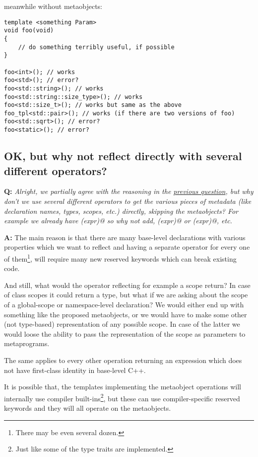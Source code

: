 meanwhile without metaobjects:

\begin{verbatim}
template <something Param>
void foo(void)
{
	// do something terribly useful, if possible
}

foo<int>(); // works
foo<std>(); // error?
foo<std::string>(); // works
foo<std::string::size_type>(); // works
foo<std::size_t>(); // works but same as the above
foo_tpl<std::pair>(); // works (if there are two versions of foo)
foo<std::sqrt>(); // error?
foo<static>(); // error?
\end{verbatim}

\subsection{OK, but why not reflect directly with several different operators?}

\textbf{Q:} {\em Alright, we partially agree with the reasoning in the
\hyperref[faq-why-metaobjects]{previous question}, but why don't we use several
different operators to get the various pieces of metadata (like declaration names,
types, scopes, etc.) directly, skipping the metaobjects?
For example we already have \verb@decltype(expr)@ so why not add,
\verb@declname(expr)@ or \verb@declscope(expr)@, etc.}

\textbf{A:} The main reason is that there are many base-level declarations
with various properties which we want to reflect and having a separate
operator for every one of them\footnote{There may be even several dozen.},
will require many new reserved keywords which can break existing code.

And still, what would the operator reflecting for example a scope return?
In case of class scopes it could return a type, but what if we are asking
about the scope of a global-scope or namespace-level declaration? We would
either end up with something like the proposed metaobjects,
or we would have to make some other (not type-based) representation of any
possible scope.
In case of the latter we would loose the ability to pass the representation
of the scope as parameters to metaprograms.

The same applies to every other operation returning an expression which does
not have first-class identity in base-level C++.

It is possible that, the templates implementing the metaobject operations
will internally use compiler built-ins\footnote{Just like some of the type traits
are implemented.}, but these can use compiler-specific reserved keywords
and they will all operate on the metaobjects.

